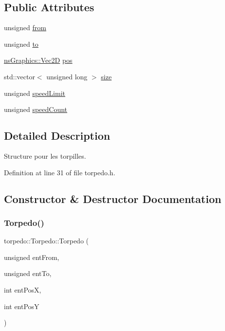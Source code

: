 \subsection*{Public Attributes}
\begin{DoxyCompactItemize}
\item 
unsigned \hyperlink{structtorpedo_1_1_torpedo_a95c15be24a51cb7908ec34c1d1f431b2}{from}
\item 
unsigned \hyperlink{structtorpedo_1_1_torpedo_af0bdb753bc200365d66c10b47da0d3ea}{to}
\item 
\hyperlink{classns_graphics_1_1_vec2_d}{ns\+Graphics\+::\+Vec2D} \hyperlink{structtorpedo_1_1_torpedo_ae9068c94dc2a9a9484e681121526ba07}{pos}
\item 
std\+::vector$<$ unsigned long $>$ \hyperlink{structtorpedo_1_1_torpedo_a583fd4c54eb71e9af5cd29de54f12ed1}{size}
\item 
unsigned \hyperlink{structtorpedo_1_1_torpedo_aa7f3b34dce9a8062bf1fe44b5ffee0e4}{speed\+Limit}
\item 
unsigned \hyperlink{structtorpedo_1_1_torpedo_ae4d35035e6e96d86ef270474b7624b62}{speed\+Count}
\end{DoxyCompactItemize}


\subsection{Detailed Description}
Structure pour les torpilles. 

Definition at line 31 of file torpedo.\+h.



\subsection{Constructor \& Destructor Documentation}
\mbox{\label{structtorpedo_1_1_torpedo_abab46a6851e2dee478c642856110661a}} 
\subsubsection{\texorpdfstring{Torpedo()}{Torpedo()}}
{\footnotesize\ttfamily torpedo\+::\+Torpedo\+::\+Torpedo (\begin{DoxyParamCaption}\item[{unsigned}]{ent\+From,  }\item[{unsigned}]{ent\+To,  }\item[{int}]{ent\+PosX,  }\item[{int}]{ent\+PosY }\end{DoxyParamCaption})}



